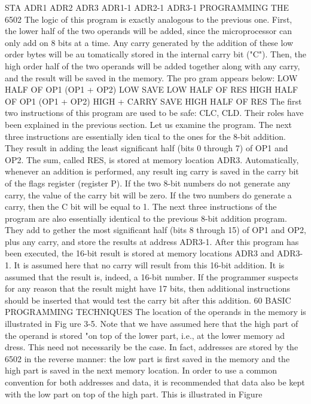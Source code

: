 \documentclass{book}
\begin{document}
STA
ADR1
ADR2
ADR3
ADR1-1
ADR2-1
ADR3-1
PROGRAMMING THE 6502
The logic of this program is exactly analogous to the previous
one. First, the lower half of the two operands will be added, since
the microprocessor can only add on 8 bits at a time. Any carry
generated by the addition of these low order bytes will be au
tomatically stored in the internal carry bit ("C"). Then, the high
order half of the two operands will be added together along with
any carry, and the result will be saved in the memory. The pro
gram appears below:
LOW HALF OF OP1
(OP1 + OP2) LOW
SAVE LOW HALF OF RES
HIGH HALF OF OP1
(OP1 + OP2) HIGH + CARRY
SAVE HIGH HALF OF RES
The first two instructions of this program are used to be safe: CLC,
CLD. Their roles have been explained in the previous section. Let us
examine the program. The next three instructions are essentially iden
tical to the ones for the 8-bit addition. They result in adding the least
significant half (bits 0 through 7) of OP1 and OP2. The sum, called
RES, is stored at memory location ADR3.
Automatically, whenever an addition is performed, any result
ing carry is saved in the carry bit of the flags register (register P).
If the two 8-bit numbers do not generate any carry, the value of
the carry bit will be zero. If the two numbers do generate a carry,
then the C bit will be equal to 1.
The next three instructions of the program are also essentially
identical to the previous 8-bit addition program. They add to
gether the most significant half (bits 8 through 15) of OP1 and
OP2, plus any carry, and store the results at address ADR3-1.
After this program has been executed, the 16-bit result is stored
at memory locations ADR3 and ADR3-1.
It is assumed here that no carry will result from this 16-bit
addition. It is assumed that the result is, indeed, a 16-bit number.
If the programmer suspects for any reason that the result might
have 17 bits, then additional instructions should be inserted that
would test the carry bit after this addition.
60
BASIC PROGRAMMING TECHNIQUES
The location of the operands in the memory is illustrated in Fig
ure 3-5.
Note that we have assumed here that the high part of the operand
is stored "on top of the lower part, i.e., at the lower memory ad
dress. This need not necessarily be the case. In fact, addresses
are stored by the 6502 in the reverse manner: the low part is first
saved in the memory and the high part is saved in the next
memory location. In order to use a common convention for both
addresses and data, it is recommended that data also be kept with
the low part on top of the high part. This is illustrated in Figure
\end{document}
